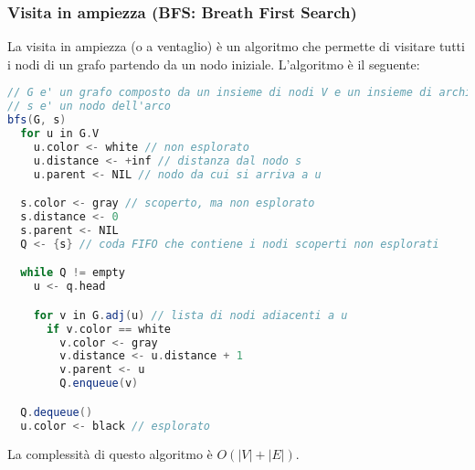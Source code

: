 \documentclass[a4paper]{article}
\begin{document}
\subsubsection{Visita in ampiezza (BFS: Breath First Search)}
La visita in ampiezza (o a ventaglio) è un algoritmo che permette di visitare tutti i nodi
di un grafo partendo da un nodo iniziale. L'algoritmo è il seguente:
\begin{lstlisting}[language=Scala]
// G e' un grafo composto da un insieme di nodi V e un insieme di archi E
// s e' un nodo dell'arco
bfs(G, s)
  for u in G.V
    u.color <- white // non esplorato
    u.distance <- +inf // distanza dal nodo s
    u.parent <- NIL // nodo da cui si arriva a u

  s.color <- gray // scoperto, ma non esplorato
  s.distance <- 0
  s.parent <- NIL
  Q <- {s} // coda FIFO che contiene i nodi scoperti non esplorati

  while Q != empty
    u <- q.head

    for v in G.adj(u) // lista di nodi adiacenti a u
      if v.color == white
        v.color <- gray
        v.distance <- u.distance + 1
        v.parent <- u
        Q.enqueue(v)

  Q.dequeue()
  u.color <- black // esplorato
\end{lstlisting}
La complessità di questo algoritmo è \(O(|V| + |E|)\).
\end{document}
